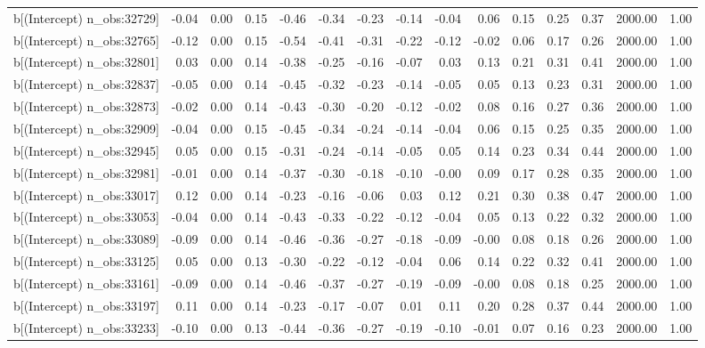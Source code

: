 \begin{table}[ht]
\begin{tabular}{rrrrrrrrrrrrrrr}
  b[(Intercept) n\_obs:32729] & -0.04 & 0.00 & 0.15 & -0.46 & -0.34 & -0.23 & -0.14 & -0.04 & 0.06 & 0.15 & 0.25 & 0.37 & 2000.00 & 1.00 \\ 
  b[(Intercept) n\_obs:32765] & -0.12 & 0.00 & 0.15 & -0.54 & -0.41 & -0.31 & -0.22 & -0.12 & -0.02 & 0.06 & 0.17 & 0.26 & 2000.00 & 1.00 \\ 
  b[(Intercept) n\_obs:32801] & 0.03 & 0.00 & 0.14 & -0.38 & -0.25 & -0.16 & -0.07 & 0.03 & 0.13 & 0.21 & 0.31 & 0.41 & 2000.00 & 1.00 \\ 
  b[(Intercept) n\_obs:32837] & -0.05 & 0.00 & 0.14 & -0.45 & -0.32 & -0.23 & -0.14 & -0.05 & 0.05 & 0.13 & 0.23 & 0.31 & 2000.00 & 1.00 \\ 
  b[(Intercept) n\_obs:32873] & -0.02 & 0.00 & 0.14 & -0.43 & -0.30 & -0.20 & -0.12 & -0.02 & 0.08 & 0.16 & 0.27 & 0.36 & 2000.00 & 1.00 \\ 
  b[(Intercept) n\_obs:32909] & -0.04 & 0.00 & 0.15 & -0.45 & -0.34 & -0.24 & -0.14 & -0.04 & 0.06 & 0.15 & 0.25 & 0.35 & 2000.00 & 1.00 \\ 
  b[(Intercept) n\_obs:32945] & 0.05 & 0.00 & 0.15 & -0.31 & -0.24 & -0.14 & -0.05 & 0.05 & 0.14 & 0.23 & 0.34 & 0.44 & 2000.00 & 1.00 \\ 
  b[(Intercept) n\_obs:32981] & -0.01 & 0.00 & 0.14 & -0.37 & -0.30 & -0.18 & -0.10 & -0.00 & 0.09 & 0.17 & 0.28 & 0.35 & 2000.00 & 1.00 \\ 
  b[(Intercept) n\_obs:33017] & 0.12 & 0.00 & 0.14 & -0.23 & -0.16 & -0.06 & 0.03 & 0.12 & 0.21 & 0.30 & 0.38 & 0.47 & 2000.00 & 1.00 \\ 
  b[(Intercept) n\_obs:33053] & -0.04 & 0.00 & 0.14 & -0.43 & -0.33 & -0.22 & -0.12 & -0.04 & 0.05 & 0.13 & 0.22 & 0.32 & 2000.00 & 1.00 \\ 
  b[(Intercept) n\_obs:33089] & -0.09 & 0.00 & 0.14 & -0.46 & -0.36 & -0.27 & -0.18 & -0.09 & -0.00 & 0.08 & 0.18 & 0.26 & 2000.00 & 1.00 \\ 
  b[(Intercept) n\_obs:33125] & 0.05 & 0.00 & 0.13 & -0.30 & -0.22 & -0.12 & -0.04 & 0.06 & 0.14 & 0.22 & 0.32 & 0.41 & 2000.00 & 1.00 \\ 
  b[(Intercept) n\_obs:33161] & -0.09 & 0.00 & 0.14 & -0.46 & -0.37 & -0.27 & -0.19 & -0.09 & -0.00 & 0.08 & 0.18 & 0.25 & 2000.00 & 1.00 \\ 
  b[(Intercept) n\_obs:33197] & 0.11 & 0.00 & 0.14 & -0.23 & -0.17 & -0.07 & 0.01 & 0.11 & 0.20 & 0.28 & 0.37 & 0.44 & 2000.00 & 1.00 \\ 
  b[(Intercept) n\_obs:33233] & -0.10 & 0.00 & 0.13 & -0.44 & -0.36 & -0.27 & -0.19 & -0.10 & -0.01 & 0.07 & 0.16 & 0.23 & 2000.00 & 1.00 \\ 

\end{tabular}
\end{table}
